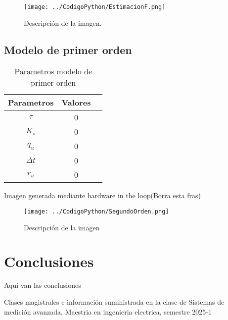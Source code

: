 \documentclass[conference]{IEEEtran}
\begin{document}
\begin{figure}[h]
	\centering
	\texttt{[image: ../CodigoPython/EstimacionF.png]}
	\caption{Descripción de la imagen.}
	\label{fig:etiqueta}
\end{figure}


\subsection{Modelo de primer orden}

\begin{table}[h]
	\centering
	\caption{Parametros modelo de primer orden}
	\label{tab:parametros_primer_orden}
	\begin{tabular}{|c|c|c|}
		\hline
		\textbf{Parametros} & \textbf{Valores} \\
		\hline
		$\tau$  &  0 \\
		$K_s$      & 0 \\
		$q_u$ & 0 \\
		$\Delta t$ & 0\\  
		$r_u$ & 0 \\ 
		\hline
	\end{tabular}
	
\end{table}

Imagen generada mediante hardware in the loop(Borra esta fras)

\begin{figure}[h]
	\centering
	\texttt{[image: ../CodigoPython/SegundoOrden.png]}
	\caption{Descripción de la imagen}
	\label{fig:etiqueta}
\end{figure}




\section{Conclusiones}

Aqui van las conclusiones

\begin{thebibliography}{00}

	\item Clases magistrales e información suministrada en la clase de Sistemas de medición avanzada, Maestria en ingenieria electrica, semestre 2025-1

\end{thebibliography}
\end{document}

